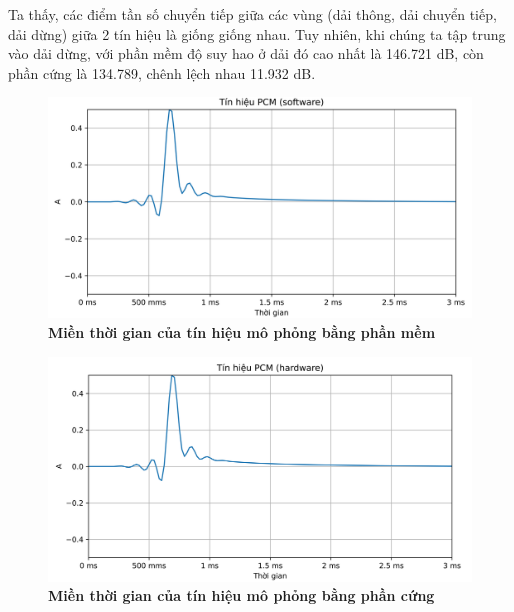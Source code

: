 Ta thấy, các điểm tần số chuyển tiếp giữa các vùng (dải thông, dải chuyển tiếp, dải dừng) giữa 2 tín hiệu là giống giống nhau. Tuy nhiên, khi chúng ta tập trung vào dải dừng, với phần mềm độ suy hao ở dải đó cao nhất là 146.721 dB, còn phần cứng là 134.789, chênh lệch nhau 11.932 dB. 

\begin{figure}[H]
    \centering
    \includegraphics[width=12cm]{Images/Chuong4/tb/sim/sin_1.png}
    \caption[Miền thời gian của tín hiệu mô phỏng bằng phần mềm]{\bfseries \fontsize{12pt}{0pt}\selectfont Miền thời gian của tín hiệu mô phỏng bằng phần mềm}
    \label{sin_1}
\end{figure}

\begin{figure}[H]
    \centering
    \includegraphics[width=12cm]{Images/Chuong4/tb/sim/sin_1_h.png}
    \caption[Miền thời gian của tín hiệu mô phỏng bằng phần cứng]{\bfseries \fontsize{12pt}{0pt}\selectfont Miền thời gian của tín hiệu mô phỏng bằng phần cứng}
    \label{sin_1_h}
\end{figure}

